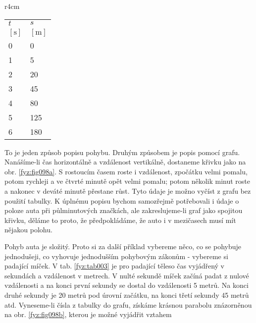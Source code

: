     \begin{wraptable}[14]{r}{4cm}      %
      \centering
      \begin{tabular}{>{\centering\arraybackslash}p{2em}|>{\centering\arraybackslash}p{3em}}
        \hline  \(t\)    & \(s\)          \\
        \([\text{s}]\)   & \([\text{m}]\)   \\
         \hline  \num{0} & \num{0}          \\
                 \num{1} & \num{5}          \\
                 \num{2} & \num{20}         \\
                 \num{3} & \num{45}         \\
                 \num{4} & \num{80}         \\
                 \num{5} & \num{125}        \\
                 \num{6} & \num{180}        \\
        \hline 
      \end{tabular}
      \caption{Dráha padajícího míčku (\cite[s.~110]{Feynman01})}
      \label{fyz:tab003}
    \end{wraptable}
    To je jeden způsob popisu pohybu. Druhým způsobem je popis pomocí grafu. Nanášíme-li čas 
    horizontálně a vzdálenost vertikálně, dostaneme křivku jako na obr. \ref{fyz:fig098a}. S 
    rostoucím časem roste i vzdálenost, zpočátku velmi pomalu, potom rychleji a ve čtvrté minutě 
    opět velmi pomalu; potom několik minut roste a nakonec v deváté minutě přestane růst. Tyto 
    údaje je možno vyčíst z grafu bez použití tabulky. K úplnému popisu bychom samozřejmě 
    potřebovali i údaje o poloze auta při půlminutových značkách, ale zakreslujeme-li graf jako 
    spojitou křivku, děláme to proto, že předpokládáme, že auto i v mezičasech musí mít nějakou 
    polohu.
    
    Pohyb auta je složitý. Proto si za další příklad vybereme něco, co se pohybuje jednodušeji, co 
    vyhovuje jednodušším pohybovým zákonům - vybereme si padající míček. V tab. \ref{fyz:tab003} je 
    pro padající těleso čas vyjádřený v sekundách a vzdálenost v metrech. V nulté sekundě míček 
    začíná padat z nulové vzdálenosti a na konci první sekundy se dostal do vzdálenosti \num{5} 
    metrů. Na konci druhé sekundy je \num{20} metrů pod úrovní začátku, na konci třetí sekundy 
    \num{45} metrů atd. Vyneseme-li čísla z tabulky do grafu, získáme krásnou parabolu znázorněnou 
    na obr. \ref{fyz:fig098b}, kterou je možné vyjádřit vztahem
    

